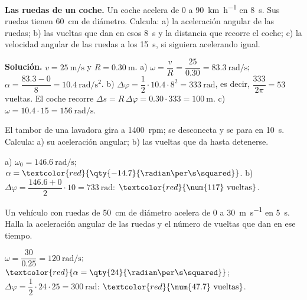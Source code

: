 \begin{example}
    \textbf{Las ruedas de un coche.} Un coche acelera de 0 a \qty{90}{\km\per\hour} en \qty{8}{\s}. Sus ruedas tienen \qty{60}{\cm}
    de diámetro. Calcula: a) la aceleración angular de las ruedas; b) las vueltas que dan en esos \qty{8}{\s} y la distancia que
    recorre el coche; c) la velocidad angular de las ruedas a los \qty{15}{\s}, si siguiera acelerando igual.

    \textbf{Solución.} \(v = \qty{25}{\m\per\s}\) y \(R = \qty{0.30}{\m}\). a) \(\omega = \dfrac{v}{R} = \dfrac{25}{\num{0.30}} =
    \qty{83.3}{\radian\per\s}\); \(\alpha = \dfrac{\num{83.3} - 0}{8} = \qty{10.4}{\radian\per\s\squared}\).
    b) \(\Delta\varphi = \dfrac{1}{2} \cdot \num{10.4} \cdot 8^2 = \qty{333}{\radian}\), es decir, \(\dfrac{333}{2\pi} = \num{53}\)
    vueltas. El coche recorre \(\Delta s = R\,\Delta\varphi = \num{0.30} \cdot 333 = \qty{100}{\m}\).
    c) \(\omega = \num{10.4} \cdot 15 = \qty{156}{\radian\per\s}\).
\end{example}

\begin{exercise}
    El tambor de una lavadora gira a \qty{1400}{rpm}; se desconecta y se para en \qty{10}{\s}. Calcula: a) su aceleración angular;
    b) las vueltas que da hasta detenerse.
    \begin{solu}
        a) \(\omega_0 = \qty{146.6}{\radian\per\s}\); \(\alpha = \textcolor{red}{\qty{-14.7}{\radian\per\s\squared}}\).
        b) \(\Delta\varphi = \dfrac{\num{146.6} + 0}{2} \cdot 10 = \qty{733}{\radian}\): \(\textcolor{red}{\num{117}~\text{vueltas}}\).
    \end{solu}
\end{exercise}

\begin{exercise}
    Un vehículo con ruedas de \qty{50}{\cm} de diámetro acelera de 0 a \qty{30}{\m\per\s} en \qty{5}{\s}. Halla la aceleración
    angular de las ruedas y el número de vueltas que dan en ese tiempo.
    \begin{solu}
        \(\omega = \dfrac{30}{\num{0.25}} = \qty{120}{\radian\per\s}\); \(\textcolor{red}{\alpha = \qty{24}{\radian\per\s\squared}}\);
        \(\Delta\varphi = \dfrac{1}{2} \cdot 24 \cdot 25 = \qty{300}{\radian}\): \(\textcolor{red}{\num{47.7}~\text{vueltas}}\).
    \end{solu}
\end{exercise}

